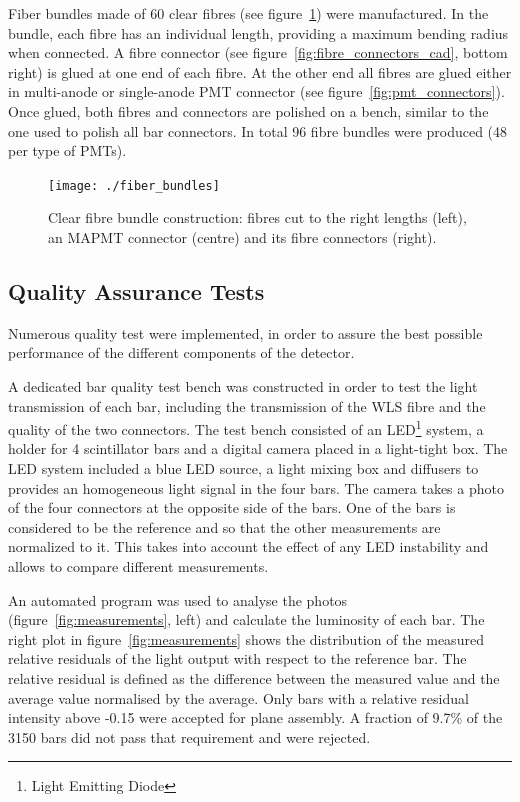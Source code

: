\documentclass[a4paper,11pt]{article}
\begin{document}
Fiber bundles made of 60 clear fibres (see figure~\ref{fig:fibre_bundles}) were manufactured. In the bundle, each fibre has an individual length, providing
a maximum bending radius when connected. A fibre connector (see figure~\ref{fig:fibre_connectors_cad}, bottom right) is glued at one end of each fibre. At
the other end all fibres are glued either in multi-anode or single-anode PMT connector (see figure~\ref{fig:pmt_connectors}). Once glued, both fibres and
connectors are polished on a bench, similar to the one used to polish all bar connectors. In total 96 fibre bundles were produced (48 per type of PMTs).

\begin{figure}[htp!]
 \centering
 \texttt{[image: ./fiber\_bundles]}
 \caption[Clear fibre bundles]{Clear fibre bundle construction: fibres cut to the right lengths (left), an MAPMT connector (centre) and its fibre
 connectors (right).}
 \label{fig:fibre_bundles}
\end{figure}

\subsection{Quality Assurance Tests}\label{construction:subsec:quality_tests}

Numerous quality test were implemented, in order to assure the best possible performance of the different components of the detector. 

A dedicated bar quality test bench was constructed in order to test the light transmission of each bar, including the transmission of the WLS fibre and the
quality of the two connectors. The test bench consisted of an LED\footnote{Light Emitting Diode} system, a holder for 4 scintillator bars and a digital
camera placed in a light-tight box. The LED system included a blue LED source, a light mixing box and diffusers to provides an homogeneous light signal
in the four bars. The camera takes a photo of the four connectors at the opposite side of the bars. One of the bars is considered to be the reference and
so that the other measurements are normalized to it. This takes into account the effect of any LED instability and allows to compare different measurements. 

An automated program was used to analyse the photos (figure~\ref{fig:measurements}, left) and calculate the luminosity of each bar. The right plot in
figure~\ref{fig:measurements} shows the distribution of the measured relative residuals of the light output with respect to the reference bar. The relative
residual is defined as the difference between the measured value and the average value normalised by the average. Only bars with a relative residual
intensity above -0.15 were accepted for plane assembly. A fraction of 9.7\% of the 3150 bars did not pass that requirement and were rejected.
\end{document}
